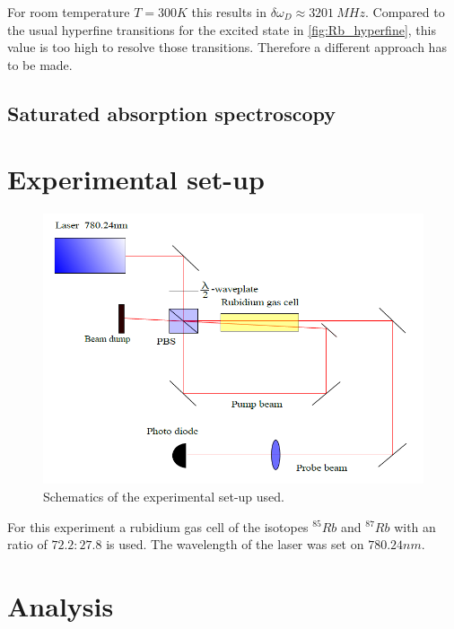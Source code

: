 \documentclass[]{article}
\begin{document}
For room temperature $T=300K$ this results in $\delta\omega_{D} \approx 3201\ MHz$. Compared to the usual hyperfine transitions for the excited state in \autoref{fig:Rb_hyperfine}, this value is too high to resolve those transitions. Therefore a different approach has to be made.

\subsection{Saturated absorption spectroscopy}



\newpage
\section{Experimental set-up}
\begin{figure}[H]
\centering
\includegraphics[width=1\textwidth]{Plots/Setup.png}
\caption{Schematics of the experimental set-up used.}
\end{figure}

For this experiment a rubidium gas cell of the isotopes $^{85}Rb$ and $^{87}Rb$ with an ratio of $72.2 : 27.8$ is used. The wavelength of the laser was set on $780.24nm$.



\newpage
\section{Analysis}
\end{document}
